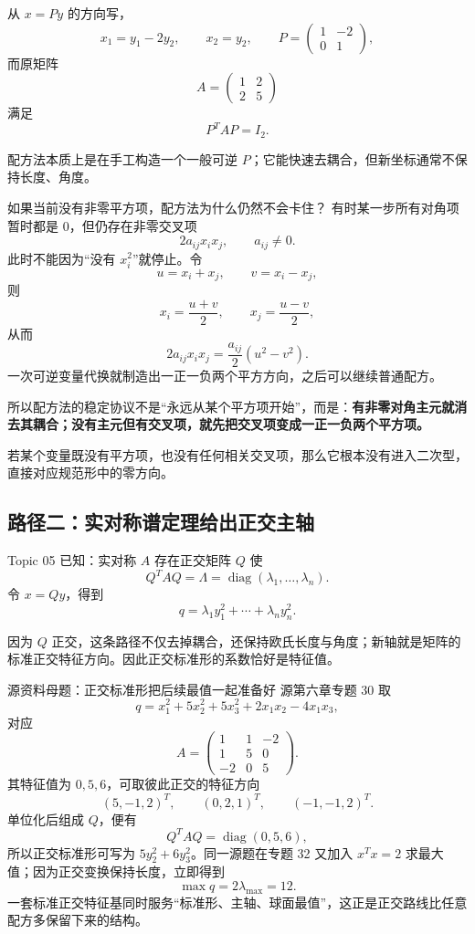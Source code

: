 \documentclass[11pt,a4paper]{ctexart}
\newcommand{\kw}[1]{\textbf{\color{deep}#1}}
\begin{document}
从 $x=Py$ 的方向写，
\[
x_1=y_1-2y_2,
\qquad x_2=y_2,
\qquad
P=\begin{pmatrix}1&-2\\0&1\end{pmatrix},
\]
而原矩阵
\[
A=\begin{pmatrix}1&2\\2&5\end{pmatrix}
\]
满足
\[
P^TAP=I_2.
\]

配方法本质上是在手工构造一个一般可逆 $P$；它能快速去耦合，但新坐标通常不保持长度、角度。

\begin{methodbox}{如果当前没有非零平方项，配方法为什么仍然不会卡住？}
有时某一步所有对角项暂时都是 $0$，但仍存在非零交叉项
\[
2a_{ij}x_ix_j,
\qquad a_{ij}\neq0.
\]
此时不能因为“没有 $x_i^2$”就停止。令
\[
u=x_i+x_j,
\qquad
v=x_i-x_j,
\]
则
\[
x_i=\frac{u+v}{2},
\qquad
x_j=\frac{u-v}{2},
\]
从而
\[
\boxed{2a_{ij}x_ix_j=\frac{a_{ij}}2(u^2-v^2).}
\]
一次可逆变量代换就制造出一正一负两个平方方向，之后可以继续普通配方。

所以配方法的稳定协议不是“永远从某个平方项开始”，而是：\kw{有非零对角主元就消去其耦合；没有主元但有交叉项，就先把交叉项变成一正一负两个平方项。}
\end{methodbox}

若某个变量既没有平方项，也没有任何相关交叉项，那么它根本没有进入二次型，直接对应规范形中的零方向。

\subsection{路径二：实对称谱定理给出正交主轴}

Topic 05 已知：实对称 $A$ 存在正交矩阵 $Q$ 使
\[
Q^TAQ=\Lambda
=\operatorname{diag}(\lambda_1,\dots,\lambda_n).
\]
令 $x=Qy$，得到
\[
q=\lambda_1y_1^2+\cdots+\lambda_ny_n^2.
\]

因为 $Q$ 正交，这条路径不仅去掉耦合，还保持欧氏长度与角度；新轴就是矩阵的标准正交特征方向。因此正交标准形的系数恰好是特征值。

\begin{examplebox}{源资料母题：正交标准形把后续最值一起准备好}
源第六章专题 30 取
\[
q=x_1^2+5x_2^2+5x_3^2+2x_1x_2-4x_1x_3,
\]
对应
\[
A=\begin{pmatrix}1&1&-2\\1&5&0\\-2&0&5\end{pmatrix}.
\]
其特征值为 $0,5,6$，可取彼此正交的特征方向
\[
(5,-1,2)^T,\qquad(0,2,1)^T,\qquad(-1,-1,2)^T.
\]
单位化后组成 $Q$，便有
\[
Q^TAQ=\operatorname{diag}(0,5,6),
\]
所以正交标准形可写为 $5y_2^2+6y_3^2$。同一源题在专题 32 又加入 $x^Tx=2$ 求最大值；因为正交变换保持长度，立即得到
\[
\max q=2\lambda_{\max}=12.
\]
一套标准正交特征基同时服务“标准形、主轴、球面最值”，这正是正交路线比任意配方多保留下来的结构。
\end{examplebox}
\end{document}
